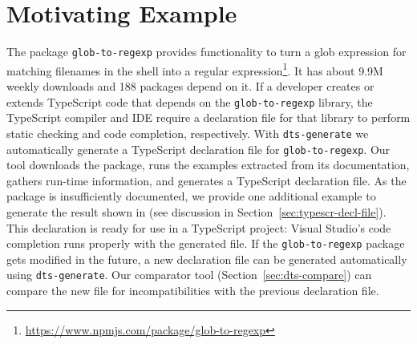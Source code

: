 \documentclass[sigconf]{acmart}
\begin{document}
\section{Motivating Example}
\label{sec:motivating-example}
The \NPM{} package \texttt{glob-to-regexp} provides functionality to turn a
glob expression for matching filenames in the shell into a regular
expression\footnote{\url{https://www.npmjs.com/package/glob-to-regexp}}. It 
has about 9.9M weekly downloads and 188 \NPM{} packages depend on it. If
a developer creates or extends TypeScript code that depends on the
\texttt{glob-to-regexp} library, the TypeScript
compiler and IDE require a declaration file for that library to
perform static checking and code completion, respectively. With
\texttt{dts-generate} we automatically generate a TypeScript
declaration file for \texttt{glob-to-regexp}. Our tool downloads the \NPM{} 
package, runs the examples extracted from its documentation, gathers
run-time information, and generates a TypeScript declaration
file. As the package is insufficiently documented, we provide one
additional example to generate the result 
shown in  (see
discussion in Section~\ref{sec:typescr-decl-file}). This declaration is
ready for use in a TypeScript project:  Visual Studio's
code completion runs properly with the generated file. If the
\texttt{glob-to-regexp} package gets modified in the future, a new declaration
file can be generated automatically using
\texttt{dts-generate}. Our comparator tool (Section~\ref{sec:dts-compare}) can compare the new file
for incompatibilities with the previous declaration file.
\end{document}
